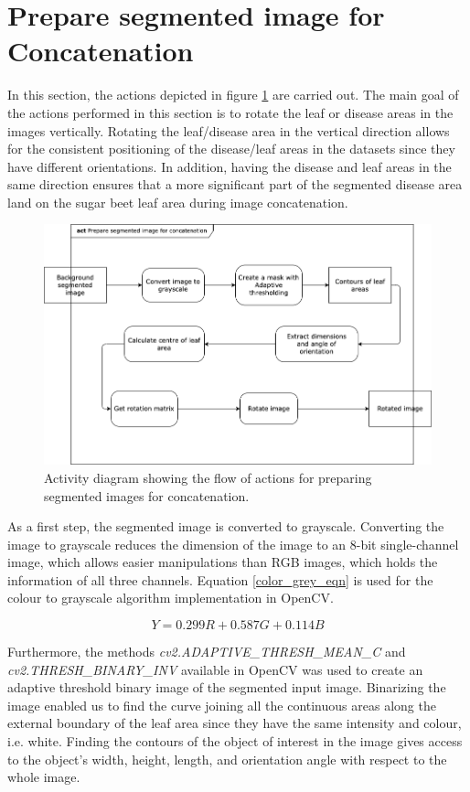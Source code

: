 \section{Prepare segmented image for Concatenation}
In this section, the actions depicted in figure \ref{fig:myact3} are carried out. The main goal of the actions performed in this section is to rotate the leaf or disease areas in the images vertically. Rotating the leaf/disease area in the vertical direction allows for the consistent positioning of the disease/leaf areas in the datasets since they have different orientations. In addition, having the disease and leaf areas in the same direction ensures that a more significant part of the segmented disease area land on the sugar beet leaf area during image concatenation. 
\begin{figure}[!htb]
    \centering
    \includegraphics[scale=0.55, keepaspectratio]{Figures/act3.png}
    \caption{Activity diagram showing the flow of actions for preparing segmented images for concatenation.}
    \label{fig:myact3}
\end{figure}

As a first step, the segmented image is converted to grayscale. Converting the image to grayscale reduces the dimension of the image to an 8-bit single-channel image, which allows easier manipulations than RGB images, which holds the information of all three channels. Equation \ref{color_grey_eqn} is used for the colour to grayscale algorithm implementation in OpenCV.


\begin{equation} \label{color_grey_eqn}
Y = 0.299 R + 0.587 G + 0.114 B
\end{equation}


Furthermore, the  methods \textit{cv2.ADAPTIVE\_THRESH\_MEAN\_C} and\\ \textit{cv2.THRESH\_BINARY\_INV} available in OpenCV was used to create an adaptive threshold binary image of the segmented input image. Binarizing the image enabled us to find the curve joining all the continuous areas along the external boundary of the leaf area since they have the same intensity and colour, i.e. white. Finding the contours of the object of interest in the image gives access to the object’s width, height, length, and orientation angle with respect to the whole image.

